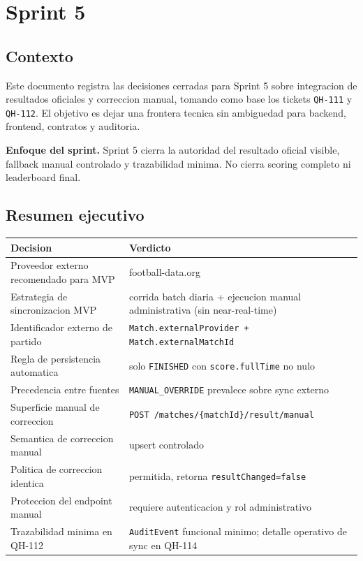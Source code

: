 \section{Sprint 5}

\subsection{Contexto}

Este documento registra las decisiones cerradas para Sprint 5 sobre integracion de resultados oficiales y correccion manual, tomando como base los tickets \texttt{QH-111} y \texttt{QH-112}. El objetivo es dejar una frontera tecnica sin ambiguedad para backend, frontend, contratos y auditoria.

\begin{docnote}
\textbf{Enfoque del sprint.} Sprint 5 cierra la autoridad del resultado oficial visible, fallback manual controlado y trazabilidad minima. No cierra scoring completo ni leaderboard final.
\end{docnote}

\subsection{Resumen ejecutivo}

\begin{longtable}{p{}p{}}
\toprule
\textbf{Decision} & \textbf{Verdicto} \\
\midrule
Proveedor externo recomendado para MVP & football-data.org \\
Estrategia de sincronizacion MVP & corrida batch diaria + ejecucion manual administrativa (sin near-real-time) \\
Identificador externo de partido & \texttt{Match.externalProvider + Match.externalMatchId} \\
Regla de persistencia automatica & solo \texttt{FINISHED} con \texttt{score.fullTime} no nulo \\
Precedencia entre fuentes & \texttt{MANUAL\_OVERRIDE} prevalece sobre sync externo \\
Superficie manual de correccion & \texttt{POST /matches/\{matchId\}/result/manual} \\
Semantica de correccion manual & upsert controlado \\
Politica de correccion identica & permitida, retorna \texttt{resultChanged=false} \\
Proteccion del endpoint manual & requiere autenticacion y rol administrativo \\
Trazabilidad minima en QH-112 & \texttt{AuditEvent} funcional minimo; detalle operativo de sync en QH-114 \\
\bottomrule
\end{longtable}

